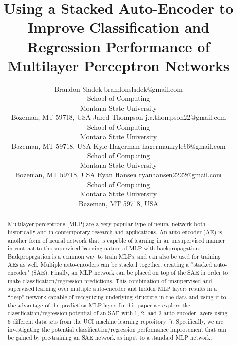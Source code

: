 \documentclass[twoside,11pt]{article}
\begin{document}
\title{Using a Stacked Auto-Encoder to Improve Classification and Regression Performance of Multilayer Perceptron Networks}

\author{\name Brandon Sladek \email 
      brandonsladek@gmail.com \\ \addr School of Computing\\ Montana State University\\
       Bozeman, MT 59718, USA
        \AND
        \name Jared Thompson \email j.a.thompson22@gmail.com \\ \addr School of Computing\\ Montana State University\\
       Bozeman, MT 59718, USA
        \AND
        \name Kyle Hagerman \email hagermankyle96@gmail.com \\ \addr School of Computing\\ Montana State University\\
       Bozeman, MT 59718, USA
        \AND
        \name Ryan Hansen \email ryanhansen2222@gmail.com \\ \addr School of Computing\\ Montana State University\\
       Bozeman, MT 59718, USA}
       
\maketitle

\begin{abstract}%
Multilayer perceptrons (MLP) are a very popular type of neural network both historically and in contemporary research and applications. An auto-encoder (AE) is another form of neural network that is capable of learning in an unsupervised manner in contrast to the supervised learning nature of MLP with backpropagation. Backpropagation is a common way to train MLPs, and can also be used for training AEs as well. Multiple auto-encoders can be stacked together, creating a ``stacked auto-encoder" (SAE). Finally, an MLP network can be placed on top of the SAE in order to make classification/regression predictions. This combination of unsupervised and supervised learning over multiple auto-encoder and hidden MLP layers results in a ``deep" network capable of recognizing underlying structure in the data and using it to the advantage of the prediction MLP layer. In this paper we explore the classification/regression potential of an SAE with 1, 2, and 3 auto-encoder layers using 6 different data sets from the UCI machine learning repository (\cite{UCI:2019}). Specifically, we are investigating the potential classification/regression performance improvement that can be gained by pre-training an SAE network as input to a standard MLP network.
\end{abstract}
\end{document}
